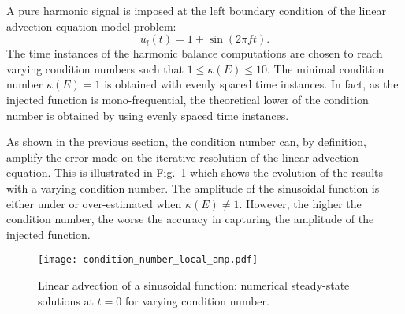 
A pure harmonic signal is imposed at the left boundary condition
of the linear advection equation model problem:
\begin{equation}
   u_l (t) = 1 + \sin \left(2 \pi f t\right).
\end{equation}
The time instances of the harmonic balance
computations are chosen to reach varying condition numbers
such that $1 \leq \kappa (E) \leq 10$.  
The minimal condition number
$\kappa(E) = 1$ is obtained with evenly spaced time instances.
In fact, as the injected function is mono-frequential, 
the theoretical lower of the condition number is obtained by using evenly
spaced time instances.

As shown in the previous section, the condition number 
can, by definition, amplify the error made
on the iterative resolution of the linear advection equation.
This is illustrated in Fig.~\ref{fig:condition_number_local_amp} which 
shows the evolution of the results with a varying condition number.
The amplitude of the
sinusoidal function is either under or over-estimated when
$\kappa (E) \neq 1$. However, 
the higher the condition number, the worse the accuracy in capturing
the amplitude of the injected function.
\begin{figure}[htbp]
  \centering
  \texttt{[image: condition\_number\_local\_amp.pdf]}
  \caption{Linear advection of a sinusoidal function: numerical steady-state 
  solutions at $t=0$ for varying condition number.}
  \label{fig:condition_number_local_amp}
\end{figure}
